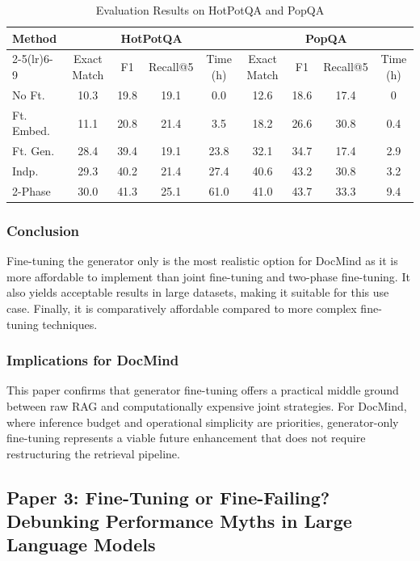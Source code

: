 \documentclass[12pt, a4paper, oneside]{report}
\let\oldsubsection\subsection
\renewcommand{\subsection}{%
  \addtocontents{toc}{\protect\needspace{3\baselineskip}}%
  \oldsubsection
}
\begin{document}
\begin{table}[H]
\centering
\caption{Evaluation Results on HotPotQA and PopQA}
\label{tab:hotpot_eval}
\begin{tabular}{lcccccccc}
\toprule
\multirow{2}{*}{Method} & \multicolumn{4}{c}{HotPotQA} & \multicolumn{4}{c}{PopQA} \\
\cmidrule(lr){2-5}\cmidrule(lr){6-9}
 & Exact Match & F1 & Recall@5 & Time (h) & Exact Match & F1 & Recall@5 & Time (h) \\
\midrule
No Ft.      & 10.3 & 19.8 & 19.1 &  0.0 & 12.6 & 18.6 & 17.4 & 0   \\
Ft. Embed.  & 11.1 & 20.8 & 21.4 &  3.5 & 18.2 & 26.6 & 30.8 & 0.4 \\
Ft. Gen.    & 28.4 & 39.4 & 19.1 & 23.8 & 32.1 & 34.7 & 17.4 & 2.9 \\
Indp.       & 29.3 & 40.2 & 21.4 & 27.4 & 40.6 & 43.2 & 30.8 & 3.2 \\
2-Phase     & 30.0 & 41.3 & 25.1 & 61.0 & 41.0 & 43.7 & 33.3 & 9.4 \\
\bottomrule
\end{tabular}
\end{table}

\subsubsection{Conclusion}

Fine-tuning the generator only is the most realistic option for DocMind as it is more affordable to implement than joint fine-tuning and two-phase fine-tuning. It also yields acceptable results in large datasets, making it suitable for this use case. Finally, it is comparatively affordable compared to more complex fine-tuning techniques.

\subsubsection{Implications for DocMind}

This paper confirms that generator fine-tuning offers a practical middle ground between raw RAG and computationally expensive joint strategies. For DocMind, where inference budget and operational simplicity are priorities, generator-only fine-tuning represents a viable future enhancement that does not require restructuring the retrieval pipeline.

\newpage
\subsection{Paper 3: Fine-Tuning or Fine-Failing? Debunking Performance Myths in Large Language Models}
\end{document}
